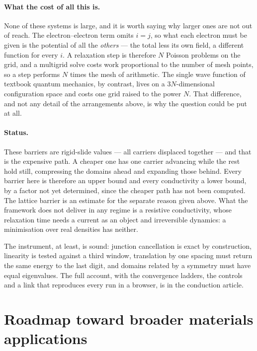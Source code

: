 \paragraph{What the cost of all this is.}
None of these systems is large, and it is worth saying why larger ones are not out of reach. The
electron--electron term omits $i=j$, so what each electron must be given is the potential of all the
\emph{others} --- the total less its own field, a different function for every $i$. A relaxation
step is therefore $N$ Poisson problems on the grid, and a multigrid solve costs work proportional to
the number of mesh points, so a step performs $N$ times the mesh of arithmetic. The single wave
function of textbook quantum mechanics, by contrast, lives on a $3N$-dimensional configuration space
and costs one grid raised to the power $N$. That difference, and not any detail of the arrangements
above, is why the question could be put at all.

\paragraph{Status.}
These barriers are rigid-slide values --- all carriers displaced together --- and that is the
expensive path. A cheaper one has one carrier advancing while the rest hold still, compressing the
domains ahead and expanding those behind. Every barrier here is therefore an upper bound and every
conductivity a lower bound, by a factor not yet determined, since the cheaper path has not been
computed. The lattice barrier is an estimate for the separate reason given above. What the framework
does not deliver in any regime is a resistive conductivity, whose relaxation time needs a current as
an object and irreversible dynamics: a minimisation over real densities has neither.

The instrument, at least, is sound: junction cancellation is exact by construction, linearity is
tested against a third window, translation by one spacing must return the same energy to the last
digit, and domains related by a symmetry must have equal eigenvalues. The full account, with the
convergence ladders, the controls and a link that reproduces every run in a browser, is in the
conduction article.

\section{Roadmap toward broader materials applications}\label{sec:material-roadmap}


